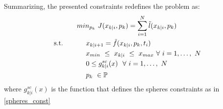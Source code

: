 Summarizing, the presented constraints redefines the problem as:
\begin{equation} 
	\begin{split}
			& min_{p_k}\ J({x}_{k|i},p_k) = \sum_{i=1}^{N}\tilde{l}({x}_{k|i},p_k) \\
			\textnormal{s.t.}\qquad
			&\ \ \ \ x_{k|i+1}=\tilde{f}(x_{k|i},p_k,t_i) \\
			&\ \ \ \ {x}_{min}\ \leq\ x_{k|i}\ \leq\ {x}_{max}\  \forall\ i=1,\dots,\ N  \\
			&\ \ \ \ 0 \leq g^{sc}_{k|i}(x)\ \ \forall\ i=1,\dots,\ N \\
			&\ \ \ \ p_k\   \in \mathbb{P}\ \\
	\end{split}	
	\label{ourproblem_param_vinc}
\end{equation}
where $g^{sc}_{k|i}(x)$ is the function that defines the spheres constraints as in \ref{spheres_const}

